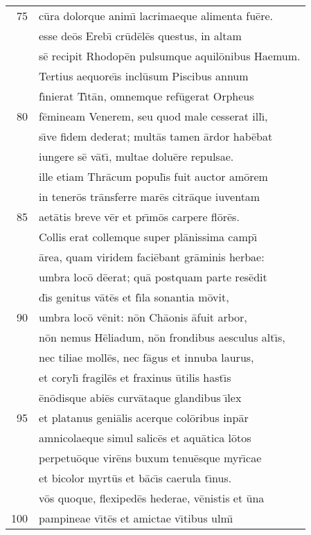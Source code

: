 \documentclass[paper=6in:9in,pagesize=pdftex,
               headinclude=on,footinclude=on,12pt]{scrbook}
\begin{document}
\begin{longtable}[p]{ r l }
75 & c\=ura dolorque anim\={\i} lacrimaeque alimenta fu\=ere.\\ 
 & esse de\=os Ereb\={\i} cr\=ud\=el\=es questus, in altam\\ 
 & s\=e recipit Rhodop\=en pulsumque aquil\=onibus Haemum.\\ 
 & \indent Tertius aequore\={\i}s incl\=usum Piscibus annum\\ 
 & f\={\i}nierat T\={\i}t\=an, omnemque ref\=ugerat Orpheus\\ 
80 & f\=emineam Venerem, seu quod male cesserat ill\={\i},\\ 
 & s\={\i}ve fidem dederat; mult\=as tamen \=ardor hab\=ebat\\ 
 & iungere s\=e v\=at\={\i}, multae dolu\=ere repulsae.\\ 
 & ille etiam Thr\=acum popul\={\i}s fuit auctor am\=orem\\ 
 & in tener\=os tr\=ansferre mar\=es citr\=aque iuventam\\ 
85 & aet\=atis breve v\=er et pr\={\i}m\=os carpere fl\=or\=es.\\ 
 & \indent Collis erat collemque super pl\=anissima camp\={\i}\\ 
 & \=area, quam viridem faci\=ebant gr\=aminis herbae:\\ 
 & umbra loc\=o d\=eerat; qu\=a postquam parte res\=edit\\ 
 & d\={\i}s genitus v\=at\=es et f\={\i}la sonantia m\=ovit,\\ 
90 & umbra loc\=o v\=enit: n\=on Ch\=aonis \=afuit arbor,\\ 
 & n\=on nemus H\=eliadum, n\=on frondibus aesculus alt\={\i}s,\\ 
 & nec tiliae moll\=es, nec f\=agus et innuba laurus,\\ 
 & et coryl\={\i} fragil\=es et fraxinus \=utilis hast\={\i}s\\ 
 & \=en\=odisque abi\=es curv\=ataque glandibus \={\i}lex\\ 
95 & et platanus geni\=alis acerque col\=oribus inp\=ar\\ 
 & amnicolaeque simul salic\=es et aqu\=atica l\=otos\\ 
 & perpetu\=oque vir\=ens buxum tenu\=esque myr\={\i}cae\\ 
 & et bicolor myrt\=us et b\=ac\={\i}s caerula t\={\i}nus.\\ 
 & v\=os quoque, flexiped\=es hederae, v\=enistis et \=una\\ 
100 & pampineae v\={\i}t\=es et amictae v\={\i}tibus ulm\={\i}\\ 

\end{longtable}
\end{document}
